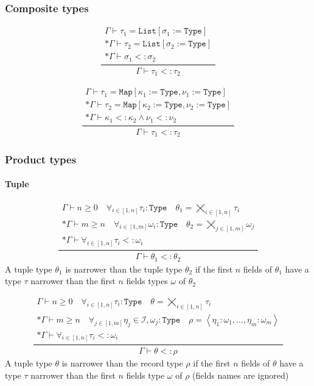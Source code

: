 \documentclass[11pt]{report}
\newcommand{\infrule}[3][gathered]{\frac{\begin{#1}#2\end{#1}}{\begin{gathered}#3\end{gathered}}}
\newcommand{\then}{\vdash}
\newcommand{\tuple}[1]{\left<#1\right>}
\newcommand{\narr}{<:}
\newcommand{\Id}{\mathcal{I}}
\newcommand{\Type}{\texttt{Type}}
\newcommand{\List}{\texttt{List}}
\newcommand{\Map}{\texttt{Map}}
\newcommand{\Env}{\Gamma}
\theoremstyle{definition}
\begin{document}
\subsubsection{Composite types}

\[
	\infrule{
		\Env\then \tau_1 = \List[\sigma_1:=\Type]\\*
		\Env\then \tau_2 = \List[\sigma_2:=\Type]\\*
		\Env\then \sigma_1 \narr \sigma_2
	}{
		\Env\then \tau_1 \narr \tau_2
	}
\]

\[
	\infrule{
		\Env\then \tau_1 = \Map[\kappa_1:=\Type, \nu_1:=\Type]\\*
		\Env\then \tau_2 = \Map[\kappa_2:=\Type, \nu_2:=\Type]\\*
		\Env\then \kappa_1 \narr \kappa_2 \land \nu_1 \narr \nu_2
	}{
		\Env\then \tau_1 \narr \tau_2
	}
\]

\newpage

\subsubsection{Product types}

\paragraph{Tuple}

\[
	\infrule{
		\Env\then n \geq 0 \quad \forall_{i\in[1,n]}{\tau_i:\Type} \quad \theta_1 = \bigtimes_{i \in [1,n]}{\tau_i}\\*
		\Env\then m \geq n \quad \forall_{i\in[1,m]}{\omega_i:\Type} \quad \theta_2 = \bigtimes_{j \in [1,m]}{\omega_j}\\*
		\Env\then \forall_{i \in [1,n]}{\tau_i \narr \omega_i}
	}{
		\Env\then \theta_1 \narr \theta_2
	}
\]
A tuple type $\theta_1$ is narrower than the tuple type $\theta_2$ if the first
$n$ fields of $\theta_1$ have a type $\tau$ narrower than the first $n$ fields
types $\omega$ of $\theta_2$

\vspace{\baselineskip}

\[
	\infrule{
		\Env\then n \geq 0 \quad \forall_{i\in[1,n]}{\tau_i:\Type} \quad \theta = \bigtimes_{i \in [1,n]}{\tau_i}\\*
		\Env\then m \geq n \quad \forall_{j\in[1,m]}{\eta_j \in \Id, \omega_j:\Type} \quad \rho = \tuple{\eta_1:\omega_1,...,\eta_m:\omega_m} \\*
		\Env\then \forall_{i \in [1,n]}{\tau_i \narr \omega_i}
	}{
		\Env\then \theta \narr \rho
	}
\]
A tuple type $\theta$ is narrower than the record type $\rho$ if the first $n$
fields of $\theta$ have a type $\tau$ narrower than the first $n$ fields type
$\omega$ of $\rho$ (fields names are ignored)
\end{document}
